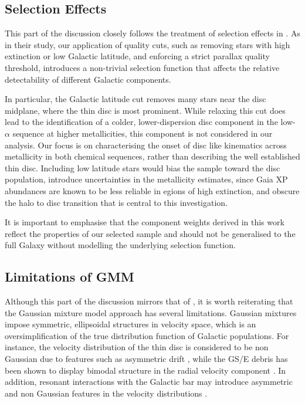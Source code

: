 \documentclass[a4paper,12pt]{article}
\begin{document}
\subsection{Selection Effects} \label{subsec:selection_effects}

This part of the discussion closely follows the treatment of selection effects in 
\citet{zhang2024existencemetalpoordiscmilky}. As in their study, our application of quality cuts, such 
as removing stars with high extinction or low Galactic latitude, and enforcing a strict parallax quality 
threshold, introduces a non-trivial selection function that affects the relative detectability of 
different Galactic components.

In particular, the Galactic latitude cut removes many stars near the disc midplane, where the 
thin disc is most prominent. While relaxing this cut does lead to the identification of a
colder, lower-dispersion disc component in the low-$\alpha$ sequence at higher metallicities, this 
component is not considered in our analysis. Our focus is on characterising the onset of disc like 
kinematics across metallicity in both chemical sequences, rather than describing the well established 
thin disc. Including low latitude stars would bias the sample toward the disc population, introduce 
uncertainties in the metallicity estimates, since Gaia XP abundances are known to be less reliable in 
egions of high extinction, and obscure the halo to disc transition that is central to this investigation.


It is important to emphasise that the component weights derived in this work reflect the properties of our 
selected sample and should not be generalised to the full Galaxy without modelling the underlying 
selection function.


\subsection{Limitations of GMM}

Although this part of the discussion mirrors that of \citet{zhang2024existencemetalpoordiscmilky}, 
it is worth reiterating that the Gaussian mixture model approach has several limitations. 
Gaussian mixtures impose symmetric, ellipsoidal structures in velocity space, 
which is an oversimplification of the true distribution function of Galactic populations. 
For instance, the velocity distribution of the thin disc is considered to be non Gaussian 
due to features such as asymmetric drift \citep{Li2024ass}, while the GS/E debris has been shown to display bimodal 
structure in the radial velocity component \citep{Lancaster2019,Necib2019}. 
In addition, resonant interactions with the Galactic bar may introduce asymmetric and non Gaussian 
features in the velocity distributions \citep[e.g.][]{Dillamore2023}. 
\end{document}
